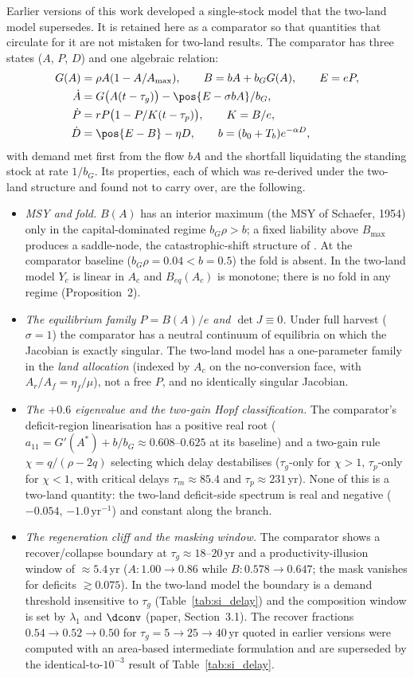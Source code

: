 Earlier versions of this work developed a single-stock model that the two-land model supersedes. It is retained here as a comparator so that quantities that circulate for it are not mistaken for two-land results. The comparator has three states ($A$, $P$, $D$) and one algebraic relation:
\begin{align}
G(A)&=\rho A(1-A/A_{\max}),\qquad B=bA+b_GG(A),\qquad E=eP,\\
\dot A&=G\big(A(t-\tau_g)\big)-\pos{E-\sigma bA}/b_G,\\
\dot P&=rP\big(1-P/K(t-\tau_p)\big),\qquad K=B/e,\\
\dot D&=\pos{E-B}-\eta D,\qquad b=(b_0+T_b)e^{-\alpha D},
\end{align}
with demand met first from the flow $bA$ and the shortfall liquidating the standing stock at rate $1/b_G$. Its properties, each of which was re-derived under the two-land structure and found not to carry over, are the following.
\begin{itemize}[leftmargin=1.5em]
\item \emph{MSY and fold.} $B(A)$ has an interior maximum (the MSY of Schaefer, 1954) only in the capital-dominated regime $b_G\rho>b$; a fixed liability above $B_{\max}$ produces a saddle-node, the catastrophic-shift structure of \citet{Scheffer2001}. At the comparator baseline ($b_G\rho=0.04<b=0.5$) the fold is absent. In the two-land model $Y_c$ is linear in $A_c$ and $B_{eq}(A_c)$ is monotone; there is no fold in any regime (Proposition~2).
\item \emph{The equilibrium family $P=B(A)/e$ and $\det J\equiv0$.} Under full harvest ($\sigma=1$) the comparator has a neutral continuum of equilibria on which the Jacobian is exactly singular. The two-land model has a one-parameter family in the \emph{land allocation} (indexed by $A_c$ on the no-conversion face, with $A_r/A_f=\eta_f/\mu$), not a free $P$, and no identically singular Jacobian.
\item \emph{The $+0.6$ eigenvalue and the two-gain Hopf classification.} The comparator's deficit-region linearisation has a positive real root ($a_{11}=G'(A^*)+b/b_G\approx0.608$--$0.625$ at its baseline) and a two-gain rule $\chi=q/(\rho-2q)$ selecting which delay destabilises ($\tau_g$-only for $\chi>1$, $\tau_p$-only for $\chi<1$, with critical delays $\tau_m\approx85.4$ and $\tau_p\approx231$\,yr). None of this is a two-land quantity: the two-land deficit-side spectrum is real and negative ($-0.054$, $-1.0\,\mathrm{yr}^{-1}$) and constant along the branch.
\item \emph{The regeneration cliff and the masking window.} The comparator shows a recover/collapse boundary at $\tau_g\approx18$--$20$\,yr and a productivity-illusion window of $\approx5.4$\,yr ($A:1.00\to0.86$ while $B:0.578\to0.647$; the mask vanishes for deficits $\gtrsim0.075$). In the two-land model the boundary is a demand threshold insensitive to $\tau_g$ (Table~\ref{tab:si_delay}) and the composition window is set by $\lambda_1$ and $\dconv$ (paper, Section~3.1). The recover fractions $0.54\to0.52\to0.50$ for $\tau_g=5\to25\to40$\,yr quoted in earlier versions were computed with an area-based intermediate formulation and are superseded by the identical-to-$10^{-3}$ result of Table~\ref{tab:si_delay}.
\end{itemize}
